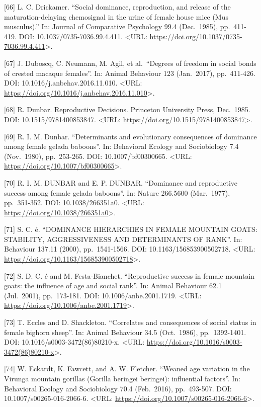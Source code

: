 \documentclass[
]{article}
\begin{document}
{[}66{]} L. C. Drickamer. ``Social dominance, reproduction, and release
of the maturation-delaying chemosignal in the urine of female house mice
(Mus musculus).'' In: Journal of Comparative Psychology 99.4
(Dec.~1985), pp.~411-419. DOI: 10.1037/0735-7036.99.4.411.
\textless URL:
\url{https://doi.org/10.1037/0735-7036.99.4.411}\textgreater.

{[}67{]} J. Duboscq, C. Neumann, M. Agil, et al.~``Degrees of freedom in
social bonds of crested macaque females''. In: Animal Behaviour 123
(Jan.~2017), pp.~411-426. DOI: 10.1016/j.anbehav.2016.11.010.
\textless URL:
\url{https://doi.org/10.1016/j.anbehav.2016.11.010}\textgreater.

{[}68{]} R. Dunbar. Reproductive Decisions. Princeton University Press,
Dec.~1985. DOI: 10.1515/9781400853847. \textless URL:
\url{https://doi.org/10.1515/9781400853847}\textgreater.

{[}69{]} R. I. M. Dunbar. ``Determinants and evolutionary consequences
of dominance among female gelada baboons''. In: Behavioral Ecology and
Sociobiology 7.4 (Nov.~1980), pp.~253-265. DOI: 10.1007/bf00300665.
\textless URL: \url{https://doi.org/10.1007/bf00300665}\textgreater.

{[}70{]} R. I. M. DUNBAR and E. P. DUNBAR. ``Dominance and reproductive
success among female gelada baboons''. In: Nature 266.5600 (Mar.~1977),
pp.~351-352. DOI: 10.1038/266351a0. \textless URL:
\url{https://doi.org/10.1038/266351a0}\textgreater.

{[}71{]} S. C. é. ``DOMINANCE HIERARCHIES IN FEMALE MOUNTAIN GOATS:
STABILITY, AGGRESSIVENESS AND DETERMINANTS OF RANK''. In: Behaviour
137.11 (2000), pp.~1541-1566. DOI: 10.1163/156853900502718.
\textless URL:
\url{https://doi.org/10.1163/156853900502718}\textgreater.

{[}72{]} S. D. C. é and M. Festa-Bianchet. ``Reproductive success in
female mountain goats: the influence of age and social rank''. In:
Animal Behaviour 62.1 (Jul.~2001), pp.~173-181. DOI:
10.1006/anbe.2001.1719. \textless URL:
\url{https://doi.org/10.1006/anbe.2001.1719}\textgreater.

{[}73{]} T. Eccles and D. Shackleton. ``Correlates and consequences of
social status in female bighorn sheep''. In: Animal Behaviour 34.5
(Oct.~1986), pp.~1392-1401. DOI: 10.1016/s0003-3472(86)80210-x.
\textless URL:
\url{https://doi.org/10.1016/s0003-3472(86)80210-x}\textgreater.

{[}74{]} W. Eckardt, K. Fawcett, and A. W. Fletcher. ``Weaned age
variation in the Virunga mountain gorillas (Gorilla beringei beringei):
influential factors''. In: Behavioral Ecology and Sociobiology 70.4
(Feb.~2016), pp.~493-507. DOI: 10.1007/s00265-016-2066-6. \textless URL:
\url{https://doi.org/10.1007/s00265-016-2066-6}\textgreater.
\end{document}

